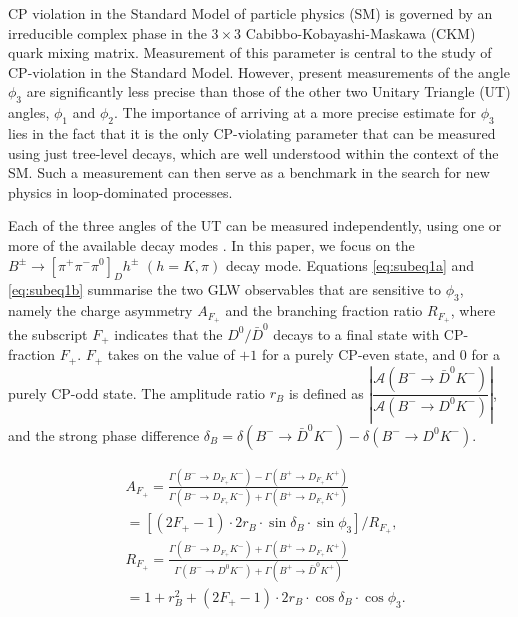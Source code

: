 \documentclass[aps,prl,twocolumn,superscriptaddress,showpacs,preprintnumbers,amsmath,amssymb]{revtex4}
\begin{document}
\maketitle

\tighten

{\renewcommand{\thefootnote}{\fnsymbol{footnote}}}
\setcounter{footnote}{0}

CP violation in the Standard Model of particle physics (SM) is governed by an irreducible complex phase in the $3 \times 3$ Cabibbo-Kobayashi-Maskawa (CKM) quark mixing matrix. Measurement of this parameter is central to the study of CP-violation in the Standard Model. However, present measurements of the angle $\phi_3$ are significantly less precise than those of the other two Unitary Triangle  (UT) angles, $\phi_1$ and $\phi_2$. The importance of arriving at a more precise estimate for $\phi_3$ lies in the fact that it is the only CP-violating parameter that can be measured using just tree-level decays, which are well understood within the context of the SM. Such a measurement can then serve as a benchmark in the search for new physics in loop-dominated processes. 

Each of the three angles of the UT can be measured independently, using one or more of the available decay modes \cite{HFAG}. In this paper, we focus on the $B^{\pm} \rightarrow [\pi^{+} \pi^{-} \pi^{0}]_{D} h^{\pm}$ $(h = K, \pi)$ decay mode. Equations \ref{eq:subeq1a} and \ref{eq:subeq1b} summarise the two GLW observables that are sensitive to $\phi_3$, namely the charge asymmetry $A_{F_+}$ and the branching fraction ratio $R_{F_+}$, where the subscript $F_+$ indicates that the $D^0/\bar{D}^0$ decays to a final state with CP-fraction $F_+$. $F_+$ takes on the value of $+1$ for a purely CP-even state, and $0$ for a purely CP-odd state. The amplitude ratio $r_B$ is defined as $\left|\dfrac{\mathcal{A}(B^- \rightarrow \bar{D}^0K^-)}{\mathcal{A}(B^- \rightarrow D^0K^-)}\right|$, and the strong phase difference $\delta_B = \delta(B^- \rightarrow \bar{D}^0K^-) - \delta(B^- \rightarrow D^0K^-)$.


\begin{subequations} \label{eq:1}
\begin{align}
&A_{F_+} = \frac{\Gamma(B^- \rightarrow D_{F_+}K^-) - \Gamma(B^+ \rightarrow D_{F_+}K^+)}{\Gamma(B^- \rightarrow D_{F_+}K^-) + \Gamma(B^+ \rightarrow D_{F_+}K^+)} \label{eq:subeq1a}\\
&=[(2F_+ -1)\cdot 2r_B \cdot \sin\delta_B\cdot\sin\phi_3]/R_{F_+} ,\nonumber \\
&R_{F_+} = \frac{\Gamma(B^- \rightarrow D_{F_+}K^-) + \Gamma(B^+ \rightarrow D_{F_+}K^+)}{\Gamma(B^- \rightarrow D^0K^-) + \Gamma(B^+ \rightarrow \bar{D}^0K^+)} \label{eq:subeq1b}\\
&=1 + r_B^2 +(2F_+ -1)\cdot 2r_B \cdot \cos\delta_B \cdot \cos\phi_3 . \nonumber 
\end{align}
\end{subequations}    
\end{document}
